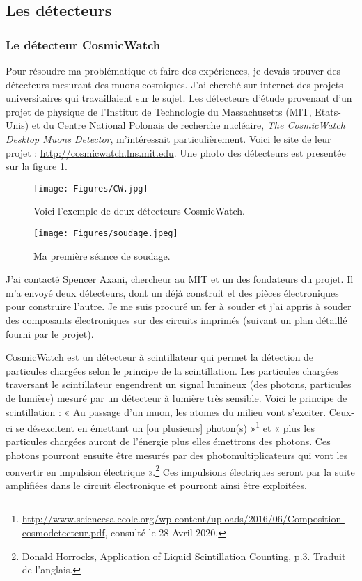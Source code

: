 \documentclass[a4paper, 12pt]{article}
\begin{document}
\begin{spacing}{1.5}
\subsection{Les détecteurs}
\subsubsection{Le détecteur CosmicWatch}
\label{sec:detecCosmic}

Pour résoudre ma problématique et faire des expériences, je devais trouver des détecteurs mesurant des muons cosmiques. J'ai cherché sur internet des projets universitaires qui travaillaient sur le sujet. Les détecteurs d'étude provenant d'un projet de physique de l'Institut de Technologie du Massachusetts (MIT, Etats-Unis) et du Centre National Polonais de recherche nucléaire, \emph{The CosmicWatch Desktop Muons Detector}, m'intéressait particulièrement. Voici le site de leur projet : \url{http://cosmicwatch.lns.mit.edu}. Une photo des détecteurs est presentée sur la figure \ref{fig:CWP}.
\begin{figure}[t]
\begin{center}
\texttt{[image: Figures/CW.jpg]} 
\caption{\label{fig:CWP} Voici l'exemple de deux détecteurs CosmicWatch.}
\end{center}
\end{figure}


\begin{figure}
\begin{center}
\texttt{[image: Figures/soudage.jpeg]}
\caption{Ma première séance de soudage.}
\end{center}
\end{figure}

J'ai contacté Spencer Axani, chercheur au MIT et un des fondateurs du projet. Il m'a envoyé deux détecteurs, dont un déjà construit et des pièces électroniques pour construire l'autre. Je me suis procuré un fer à souder et j'ai appris à souder des composants électroniques sur des circuits imprimés (suivant un plan détaillé fourni par le projet).

CosmicWatch est un détecteur à scintillateur qui permet la détection de particules chargées selon le principe de la scintillation. Les particules chargées traversant le scintillateur engendrent un signal lumineux (des photons, particules de lumière) mesuré par un détecteur à lumière très sensible. Voici le principe de scintillation : « Au passage d'un muon, les atomes du milieu vont s'exciter. Ceux-ci se désexcitent en émettant un [ou plusieurs] photon(s) »\footnote{\url{http://www.sciencesalecole.org/wp-content/uploads/2016/06/Composition-cosmodetecteur.pdf}, consulté le 28 Avril 2020.} et « plus les particules chargées auront de l’énergie plus elles émettrons des photons. Ces photons pourront ensuite être mesurés par des photomultiplicateurs qui vont les convertir en impulsion électrique ».\footnote{Donald Horrocks, Application of Liquid Scintillation Counting, p.3. Traduit de l'anglais.} Ces impulsions électriques seront par la suite amplifiées dans le circuit électronique et pourront ainsi être exploitées.



\end{spacing}
\end{document}
